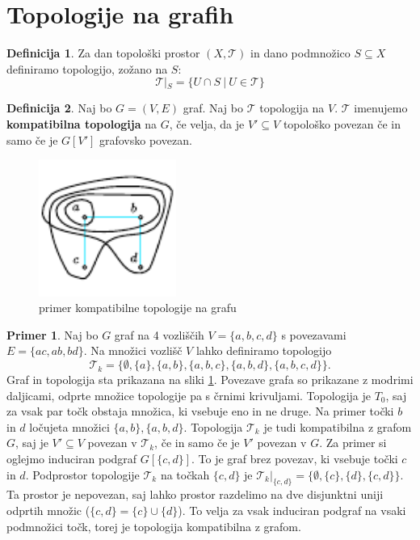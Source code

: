 \documentclass[a4paper, 12pt]{book}
\theoremstyle{definition}
\newtheorem{definition}{Definicija}[section]
\newtheorem{example}{Primer}[section]
\theoremstyle{remark}
\begin{document}
\section{Topologije na grafih}
\begin{definition}
  Za dan topološki prostor $(X, \mathcal{T})$ in dano podmnožico $S \subseteq X$ definiramo
  topologijo, zožano na $S$: \[\mathcal{T}|_S = \{U \cap S\ |\ U \in \mathcal{T}\}\]
\end{definition}
\begin{definition}
  Naj bo $G = (V,E)$ graf. Naj bo $\mathcal{T}$ topologija na $V$. $\mathcal{T}$ imenujemo \textbf{kompatibilna
  topologija} na $G$, če velja, da je
  $V' \subseteq V$ topološko povezan če in samo če je $G[V']$ grafovsko povezan.
\end{definition}
\newpage
\begin{figure}[h]
  \begin{center}
  \includegraphics[width=0.4\textwidth]{compatible-topology.pdf}
  \end{center}
  \caption{primer kompatibilne topologije na grafu}
  \label{compat-topol}
\end{figure}
\begin{example}
  Naj bo $G$ graf na 4 vozliščih $V=\{a,b,c,d\}$ s povezavami $E=\{ac,ab,bd\}$. Na množici
  vozlišč $V$ lahko definiramo topologijo \[\mathcal{T}_k = \{\emptyset, \{a\}, \{a, b\}, \{a, b, c\}, \{a, b, d\}, \{a, b, c, d\}\}.\]
  Graf in topologija sta prikazana na sliki \ref{compat-topol}. Povezave grafa so prikazane z modrimi daljicami,
  odprte množice topologije pa s črnimi krivuljami. Topologija je $T_0$, saj za vsak par točk
  obstaja množica, ki vsebuje eno in ne druge. Na primer točki $b$ in $d$ ločujeta množici $\{a, b\}, \{a, b, d\}$.
  Topologija $\mathcal{T}_k$ je tudi kompatibilna z grafom $G$, saj je $V' \subseteq V$ povezan v $\mathcal{T}_k$,
  če in samo če je $V'$ povezan v $G$. Za primer si oglejmo induciran podgraf $G[\{c,d\}]$. To je graf brez povezav, ki vsebuje točki $c$ in $d$. Podprostor
  topologije $\mathcal{T}_k$ na točkah $\{c,d\}$ je $\mathcal{T}_k|_{\{c,d\}} = \{\emptyset, \{c\}, \{d\}, \{c, d\}\}$.
  Ta prostor je nepovezan, saj lahko prostor razdelimo na dve disjunktni uniji odprtih množic ($\{c, d\} = \{c\} \cup \{d\}$).
  To velja za vsak induciran podgraf na vsaki podmnožici točk, torej je topologija kompatibilna z grafom.
\end{example}
\end{document}
